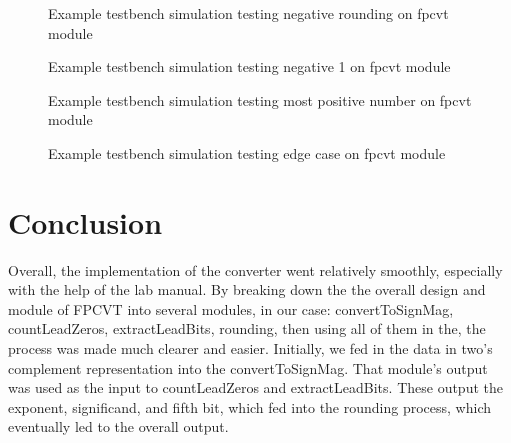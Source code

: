 \documentclass{article}
\begin{document}
\begin{figure}[H]
	\begin{center}
		\caption{Example testbench simulation testing negative rounding on fpcvt module}
	\end{center}
\end{figure}

\begin{figure}[H]
	\begin{center}
		\caption{Example testbench simulation testing negative 1 on fpcvt module}
	\end{center}
\end{figure}

\begin{figure}[H]
	\begin{center}
		\caption{Example testbench simulation testing most positive number on fpcvt module}
	\end{center}
\end{figure}

\begin{figure}[H]
	\begin{center}
		\caption{Example testbench simulation testing edge case on fpcvt module}
	\end{center}
\end{figure}

\section*{Conclusion}


Overall, the implementation of the converter went relatively smoothly, especially with the help of the lab manual.  By breaking down the the overall design and module of FPCVT into several modules, in our case: convertToSignMag, countLeadZeros, extractLeadBits, rounding, then using all of them in the, the process was made much clearer and easier.  Initially, we fed in the data in two's complement representation into the convertToSignMag.  That module's output was used as the input to countLeadZeros and extractLeadBits.  These output the exponent, significand, and fifth bit, which fed into the rounding process, which eventually led to the overall output. \\
\end{document}
